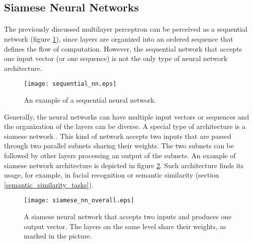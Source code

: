 \subsection{Siamese Neural Networks}
\paragraph{}
The previously discussed multilayer perceptron can be perceived as a sequential network (figure \ref{sequential_neural_network}), since layers are organized into an ordered sequence that defines the flow of computation. However, the sequential network that accepts one input vector (or one sequence) is not the only type of neural network architecture. 

\begin{figure}[!h]
	\texttt{[image: sequential\_nn.eps]}
	\centering
	\caption{An example of a sequential neural network.}
	\label{sequential_neural_network}
\end{figure}

Generally, the neural networks can have multiple input vectors or sequences and the organization of the layers can be diverse. A special type of architecture is a siamese network \cite{siamese_nn}. This kind of network accepts two inputs that are passed through two parallel subnets sharing their weights. The two subnets can be followed by other layers processing an output of the subnets. An example of siamese network architecture is depicted in figure \ref{siamese_neural_network_fig}. Such architecture finds its usage, for example, in facial recognition or semantic similarity (section \ref{semantic_similarity_tasks}).

\begin{figure}[!h]
	\texttt{[image: siamese\_nn\_overall.eps]}
	\centering
	\caption{A siamese neural network that accepts two inputs and produces one output vector. The layers on the same level share their weights, as marked in the picture.}
	\label{siamese_neural_network_fig}
\end{figure}  

